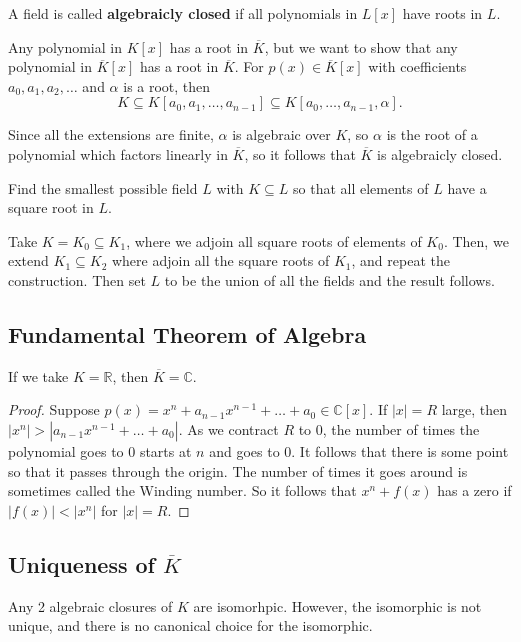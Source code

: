\documentclass[11pt]{scrartcl}
\newcommand{\R}{\mathbb{R}}
\newcommand{\C}{\mathbb C}
\begin{document}
A field is called \textbf{algebraicly closed} if all polynomials in $L[x]$ have roots in $L$.  

Any polynomial in $K[x]$ has a root in $\overline{K}$, but we want to show that any polynomial in $\overline{K}[x]$ has a root in $\overline{K}$.  For $p(x) \in \overline{K}[x]$ with coefficients $a_0, a_1, a_2, \dots$ and $\alpha$ is a root, then
$$K \subseteq K[a_0, a_1, \dots, a_{n-1}] \subseteq K[a_0, \dots, a_{n-1}, \alpha].$$

Since all the extensions are finite, $\alpha$ is algebraic over $K$, so $\alpha$ is the root of a polynomial which factors linearly in $\overline{K}$, so it follows that $\overline{K}$ is algebraicly closed.

\begin{example} Find the smallest possible field $L$ with $K \subseteq L$ so that all elements of $L$ have a square root in $L$. 

Take $K = K_0 \subseteq K_1$, where we adjoin all square roots of elements of $K_0$.  Then, we extend $K_1 \subseteq K_2$ where adjoin all the square roots of $K_1$, and repeat the construction.  Then set $L$ to be the union of all the fields and the result follows.  
 \end{example}

\subsection{Fundamental Theorem of Algebra}
If we take $K = \R$, then $\overline{K} = \C$.  
 \begin{proof}
 Suppose $p(x) = x^n + a_{n-1}x^{n-1} + \dots + a_0 \in \C[x]$.  If $|x| = R$ large, then $|x^n| > |a_{n-1}x^{n-1 } + \dots + a_0|$.  As we contract $R$ to $0$, the number of times the polynomial goes to $0$ starts at $n$ and goes to $0$.  It follows that there is some point so that it passes through the origin.  The number of times it goes around is sometimes called the Winding number.  So it follows that $x^n + f(x)$ has a zero if $|f(x)| < |x^n|$ for $|x| = R$.  
 \end{proof}
 
 \subsection{Uniqueness of $\overline{K}$}
 Any 2 algebraic closures of $K$ are isomorhpic.  However, the isomorphic is not unique, and there is no canonical choice for the isomorphic.  
 
\end{document}
